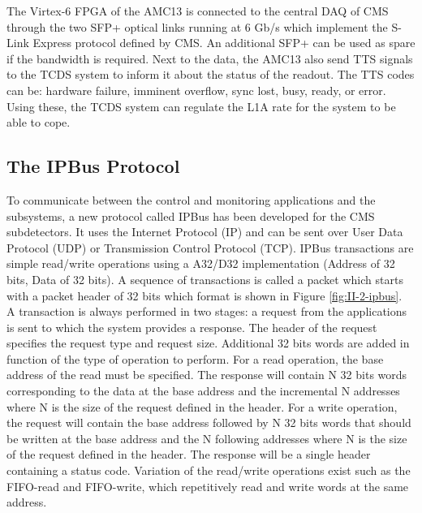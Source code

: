       The Virtex-6 FPGA of the AMC13 is connected to the central DAQ of CMS through the two SFP+ optical links running at 6 Gb/s which implement the S-Link Express protocol defined by CMS. An additional SFP+ can be used as spare if the bandwidth is required. Next to the data, the AMC13 also send TTS signals to the TCDS system to inform it about the status of the readout. The TTS codes can be: hardware failure, imminent overflow, sync lost, busy, ready, or error. Using these, the TCDS system can regulate the L1A rate for the system to be able to cope.

    \subsection{The IPBus Protocol}
    \label{sec:II-2-ipbus}

      To communicate between the control and monitoring applications and the subsystems, a new protocol called IPBus has been developed for the CMS subdetectors. It uses the Internet Protocol (IP) and can be sent over User Data Protocol (UDP) or Transmission Control Protocol (TCP). IPBus transactions are simple read/write operations using a A32/D32 implementation (Address of 32 bits, Data of 32 bits). A sequence of transactions is called a packet which starts with a packet header of 32 bits which format is shown in Figure \ref{fig:II-2-ipbus}. \\

      A transaction is always performed in two stages: a request from the applications is sent to which the system provides a response. The header of the request specifies the request type and request size. Additional 32 bits words are added in function of the type of operation to perform. For a read operation, the base address of the read must be specified. The response will contain N 32 bits words corresponding to the data at the base address and the incremental N addresses where N is the size of the request defined in the header. For a write operation, the request will contain the base address followed by N 32 bits words that should be written at the base address and the N following addresses where N is the size of the request defined in the header. The response will be a single header containing a status code. Variation of the read/write operations exist such as the FIFO-read and FIFO-write, which repetitively read and write words at the same address. \\

